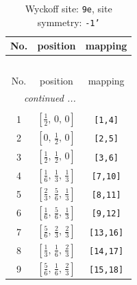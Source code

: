 \documentclass[fleqn,8pt]{jsarticle}
\begin{document}
\begin{longtable}{ccc}
\caption{Wyckoff site: {\tt 9e}, site symmetry: {\tt -1'}}
 \\
 \hline \hline
No. & position & mapping \\ \hline \endfirsthead

\multicolumn{2}{l}{\tablename\ \thetable{}} \\
 \hline \hline
No. & position & mapping \\ \hline \endhead

 \hline \hline
\multicolumn{2}{r}{\footnotesize\it continued ...} \\ \endfoot

 \hline \hline
\multicolumn{2}{r}{} \\ \endlastfoot

1 & $\left[ \frac{1}{2},\, 0,\, 0 \right]$ & {\tt [1,4]} \\ \hline
2 & $\left[ 0,\, \frac{1}{2},\, 0 \right]$ & {\tt [2,5]} \\ \hline
3 & $\left[ \frac{1}{2},\, \frac{1}{2},\, 0 \right]$ & {\tt [3,6]} \\ \hline
4 & $\left[ \frac{1}{6},\, \frac{1}{3},\, \frac{1}{3} \right]$ & {\tt [7,10]} \\ \hline
5 & $\left[ \frac{2}{3},\, \frac{5}{6},\, \frac{1}{3} \right]$ & {\tt [8,11]} \\ \hline
6 & $\left[ \frac{1}{6},\, \frac{5}{6},\, \frac{1}{3} \right]$ & {\tt [9,12]} \\ \hline
7 & $\left[ \frac{5}{6},\, \frac{2}{3},\, \frac{2}{3} \right]$ & {\tt [13,16]} \\ \hline
8 & $\left[ \frac{1}{3},\, \frac{1}{6},\, \frac{2}{3} \right]$ & {\tt [14,17]} \\ \hline
9 & $\left[ \frac{5}{6},\, \frac{1}{6},\, \frac{2}{3} \right]$ & {\tt [15,18]} \\
\end{longtable}
\renewcommand{\arraystretch}{1.2}
\end{document}
